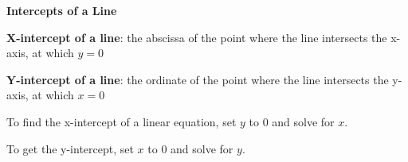 \begin{center}
\textbf{Intercepts of a Line}
\end{center}

\vspace*{1ex}

\textbf{X-intercept of a line}: the abscissa of the point where the line intersects the x-axis, at which $y = 0$  
\vspce 

\textbf{Y-intercept of a line}:  the ordinate of the point where the line intersects the y-axis, at which $x=0$ 

\vspce 

To find the x-intercept of a linear equation, set $y$ to 0 and solve for $x$. 

\vspce 

To get the y-intercept, set $x$ to 0 and solve for $y$.


